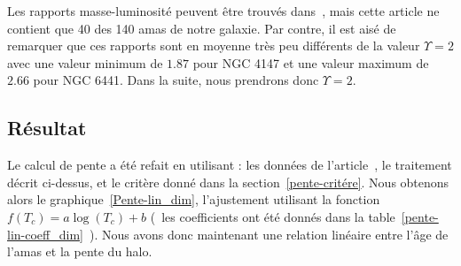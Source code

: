	Les rapports masse-luminosité peuvent être trouvés dans~\cite{McL}, mais cette article ne contient que 40 des 140 amas de notre galaxie.
	Par contre, il est aisé de remarquer que ces rapports sont
	en moyenne très peu différents de la valeur $\Upsilon = 2$ avec une valeur minimum de $1.87$ pour NGC 4147 et une valeur maximum de
	$2.66$ pour NGC 6441. Dans la suite, nous prendrons donc $\Upsilon = 2$.


\subsection{Résultat}
	Le calcul de pente a été refait en utilisant : les données de l'article~\cite{TragerTable}, le traitement décrit ci-dessus, et le critère donné dans la section~\ref{pente-critére}.
	Nous obtenons alors le graphique~\ref{Pente-lin_dim}, l'ajustement utilisant la fonction
	$f(T_c) = a \log(T_c) + b$ (~les coefficients ont été donnés dans la table~\ref{pente-lin-coeff_dim}~).
	Nous avons donc maintenant une relation linéaire entre l'âge de l'amas et la pente du halo.

